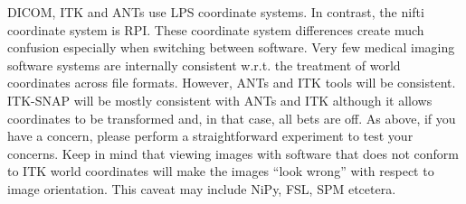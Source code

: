 \documentclass{InsightArticle}
\begin{document}
DICOM, ITK and ANTs use LPS coordinate systems.  
In contrast, the nifti coordinate system is RPI.  
These coordinate system differences create much confusion
especially when switching between software.  Very
few medical imaging software systems are internally consistent w.r.t. the
treatment of world coordinates across file formats.
However, ANTs and ITK tools will be consistent.  ITK-SNAP will be
mostly consistent with ANTs and ITK although it allows coordinates to
be transformed and, in that case, all bets are off.  As above, if you have a concern, please
perform a straightforward experiment to test your concerns.  Keep in
mind that viewing images with software that does not conform to ITK
world coordinates will make the images ``look wrong'' with respect to
image orientation.  This caveat may include NiPy, FSL, SPM etcetera.
\end{document}
